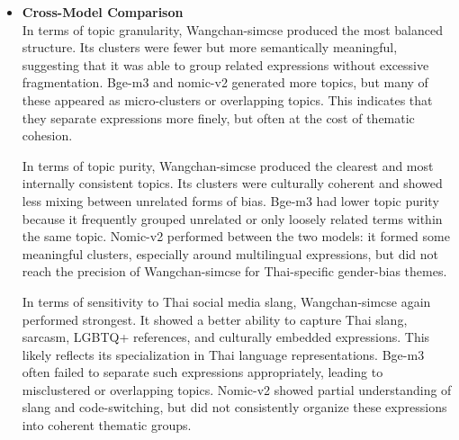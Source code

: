\documentclass[12pt,oneside,openright,a4paper]{cpe-english-project}
\begin{document}
\begin{itemize}
Nomic-v2 produced 278 topics, the highest number among the three models. This suggests that it often created overly fine-grained clusters, resulting in many narrowly defined topics. Some of these topics successfully captured multilingual or code-switched expressions, showing that nomic-v2 can represent general multilingual semantic patterns. However, many clusters revolved around common functional expressions, such as ``ได้'', ``มี'', and ``ไม่'', which reduced interpretability because these words do not necessarily represent meaningful gender-bias themes. Therefore, nomic-v2 achieved reasonable general semantic grouping but lacked Thai-specific contextual depth. Its output was more interpretable than Bge-m3 in some multilingual cases, but less coherent and culturally precise than Wangchan-simcse for Thai gender-bias discourse.

\item \textbf{Cross-Model Comparison}\\
In terms of topic granularity, Wangchan-simcse produced the most balanced structure. Its clusters were fewer but more semantically meaningful, suggesting that it was able to group related expressions without excessive fragmentation. Bge-m3 and nomic-v2 generated more topics, but many of these appeared as micro-clusters or overlapping topics. This indicates that they separate expressions more finely, but often at the cost of thematic cohesion.

In terms of topic purity, Wangchan-simcse produced the clearest and most internally consistent topics. Its clusters were culturally coherent and showed less mixing between unrelated forms of bias. Bge-m3 had lower topic purity because it frequently grouped unrelated or only loosely related terms within the same topic. Nomic-v2 performed between the two models: it formed some meaningful clusters, especially around multilingual expressions, but did not reach the precision of Wangchan-simcse for Thai-specific gender-bias themes.

In terms of sensitivity to Thai social media slang, Wangchan-simcse again performed strongest. It showed a better ability to capture Thai slang, sarcasm, LGBTQ+ references, and culturally embedded expressions. This likely reflects its specialization in Thai language representations. Bge-m3 often failed to separate such expressions appropriately, leading to misclustered or overlapping topics. Nomic-v2 showed partial understanding of slang and code-switching, but did not consistently organize these expressions into coherent thematic groups.


\end{itemize}
\end{document}
